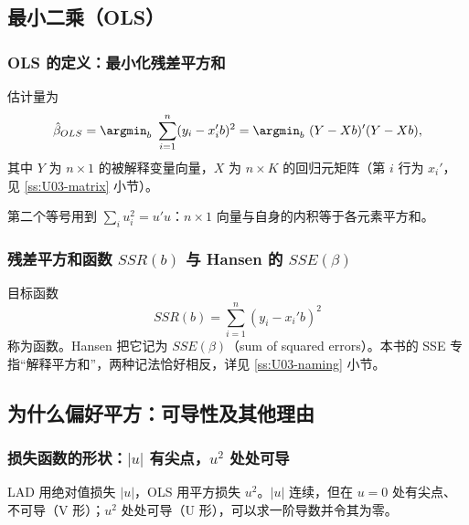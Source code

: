 \subsection{最小二乘（OLS）}

\subsubsection{OLS 的定义：最小化残差平方和}

\begin{defn}\label{def:U03-ols}
估计量为
\[
\hat\beta_{OLS}=\argmin_b\ \sum_{i=1}^n(y_i-x_i'b)^2=\argmin_b\ (Y-Xb)'(Y-Xb),
\]
其中 $Y$ 为 $n\times1$ 的被解释变量向量，$X$ 为 $n\times K$ 的回归元矩阵（第 $i$ 行为 $x_i'$，见 \ref{ss:U03-matrix} 小节）。
\end{defn}

第二个等号用到 $\sum_iu_i^2=u'u$：$n\times1$ 向量与自身的内积等于各元素平方和。

\subsubsection{残差平方和函数 \texorpdfstring{$SSR(b)$}{SSR(b)} 与 Hansen 的 \texorpdfstring{$SSE(\beta)$}{SSE(beta)}}

目标函数
\[
SSR(b)=\sum_{i=1}^n(y_i-x_i'b)^2
\]
称为函数。Hansen 把它记为 $SSE(\beta)$（sum of squared errors）。本书的 SSE 专指“解释平方和”，两种记法恰好相反，详见 \ref{ss:U03-naming} 小节。

\subsection{为什么偏好平方：可导性及其他理由}

\subsubsection{损失函数的形状：\texorpdfstring{$|u|$}{|u|} 有尖点，\texorpdfstring{$u^2$}{u\^{}2} 处处可导}

LAD 用绝对值损失 $|u|$，OLS 用平方损失 $u^2$。$|u|$ 连续，但在 $u=0$ 处有尖点、不可导（V 形）；$u^2$ 处处可导（U 形），可以求一阶导数并令其为零。

\begin{center}
\end{center}

